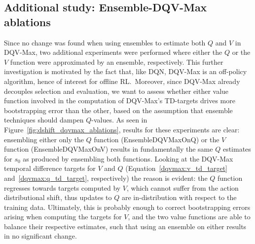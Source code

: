 \subsection{Additional study: Ensemble-DQV-Max ablations}
Since no change was found when using ensembles to estimate both $Q$
and $V$ in DQV-Max, two additional experiments were performed where
either the $Q$ or the $V$ function were approximated by an ensemble,
respectively. This further investigation is motivated by the fact
that, like DQN, DQV-Max is an off-policy algorithm, hence of interest
for offline RL.\ Moreover, since DQV-Max already decouples selection
and evaluation, we want to assess whether either value function
involved in the computation of DQV-Max's TD-targets drives more
bootstrapping error than the other, based on the assumption that
ensemble techniques should dampen $Q$-values.
As seen in Figure~\ref{fig:dshift_dqvmax_ablations}, results for these
experiments are clear: ensembling either only the $Q$ function
(EnsembleDQVMaxOnQ) or the $V$ function (EnsembleDQVMaxOnV) results in
fundamentally the same $Q$ estimates for $s_0$ as produced by
ensembling both functions. Looking at the DQV-Max temporal difference
targets for $V$ and $Q$ (Equation~\ref{dqvmax:v_td_target}
and~\ref{dqvmax:q_td_target}, respectively) the reason is evident: the
$Q$ function regresses towards targets computed by $V$, which cannot
suffer from the action distributional shift, thus updates to $Q$ are
in-distribution with respect to the training data. Ultimately, this is
probably enough to correct bootstrapping errors arising when computing
the targets for $V$, and the two value functions are able to balance
their respective estimates, such that using an ensemble on either
results in no significant change.
